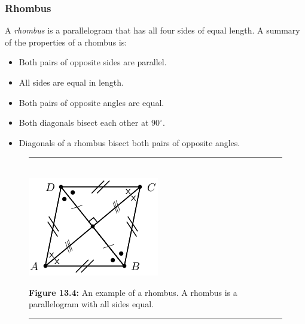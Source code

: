             \subsubsection{ Rhombus}
            \nopagebreak
          \label{m39354*id319041}A \textsl{rhombus} is a parallelogram that has all four sides of equal length. A summary of the properties of a rhombus is:\par 
          \label{m39354*id319051}\begin{itemize}[noitemsep]
            \label{m39354*uid70}\item Both pairs of opposite sides are parallel.
\label{m39354*uid71}\item All sides are equal in length.
\label{m39354*uid72}\item Both pairs of opposite angles are equal.
\label{m39354*uid73}\item Both diagonals bisect each other at ${90}^{\circ }$.
\label{m39354*uid74}\item Diagonals of a rhombus bisect both pairs of opposite angles.
\end{itemize}
    \setcounter{subfigure}{0}
	\begin{figure}[H] %
    \begin{center}
    \rule[.1in]{\figurerulewidth}{.005in} \\
        \label{m39354*uid75!!!underscore!!!media}\label{m39354*uid75!!!underscore!!!printimage}\includegraphics{col11306.imgs/m39354_MG10C13_043.png} %
      \vspace{2pt}
    \vspace{\rubberspace}\par \begin{cnxcaption}
	  \small \textbf{Figure 13.4: }An example of a rhombus. A rhombus is a parallelogram with all sides equal.
	\end{cnxcaption}
    \vspace{.1in}
    \rule[.1in]{\figurerulewidth}{.005in} \\
    \end{center}
 \end{figure}       
        \label{m39354*uid76}
